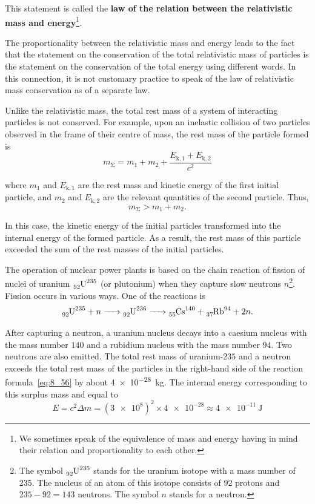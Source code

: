 \noindent
This statement is called the \textbf{law of the relation between the relativistic mass and energy}\footnote{We sometimes speak of the equivalence of mass and energy having in mind their relation and proportionality to each other.}.

The proportionality between the relativistic mass and energy leads to the fact that the statement on the conservation of the total relativistic mass of particles is the statement on the conservation of the total energy using different words. In this connection, it is not customary practice to speak of the law of relativistic mass conservation as of a separate law.

Unlike the relativistic mass, the total rest mass of a system of interacting particles is not conserved. For example, upon an inelastic collision of two particles observed in the frame of their centre of mass, the rest mass of the particle formed is
\begin{equation*}
	m_{\upSigma} = m_1 + m_2 + \frac{E_{\text{k},1}+E_{\text{k},2}}{c^2}
\end{equation*}

\noindent
where $m_1$ and $E_{\text{k},1}$ are the rest mass and kinetic energy of the first initial particle, and $m_2$ and $E_{\text{k},2}$ are the relevant quantities of the second particle. Thus,
\begin{equation*}
	m_{\upSigma} > m_1 + m_2.
\end{equation*}

\noindent
In this case, the kinetic energy of the initial particles transformed into the internal energy of the formed particle. As a result, the rest mass of this particle exceeded the sum of the rest masses of the initial particles.

The operation of nuclear power plants is based on the chain reaction of fission of nuclei of uranium $\ce{_92U^235}$ (or plutonium) when they capture slow neutrons $n$\footnote{The symbol $\ce{_92U^235}$ stands for the uranium isotope with a mass number of 235. The nucleus of an atom of this isotope consists of $92$ protons and $235-92=143$ neutrons. The symbol $n$ stands for a neutron.}. Fission occurs in various ways. One of the reactions is
\begin{equation}\label{eq:8_56}
	\ce{_92U^235 + }n \ce{-> _92U^236 -> _55Cs^140 + _37Rb^94 + 2}n.
\end{equation}

\noindent
After capturing a neutron, a uranium nucleus decays into a caesium nucleus with the mass number $140$ and a rubidium nucleus with the mass number $94$. Two neutrons are also emitted. The total rest mass of uranium-$235$ and a neutron exceeds the total rest mass of the particles in the right-hand side of the reaction formula~\eqref{eq:8_56} by about \SI{4e-28}{\kilo\gram}. The internal energy corresponding to this surplus mass and equal to
\begin{equation*}
	E = c^2\Delta m = \left(\num{3e8}\right)^2 \times \num{4e-28} \approx \SI{4e-11}{\joule}
\end{equation*}

